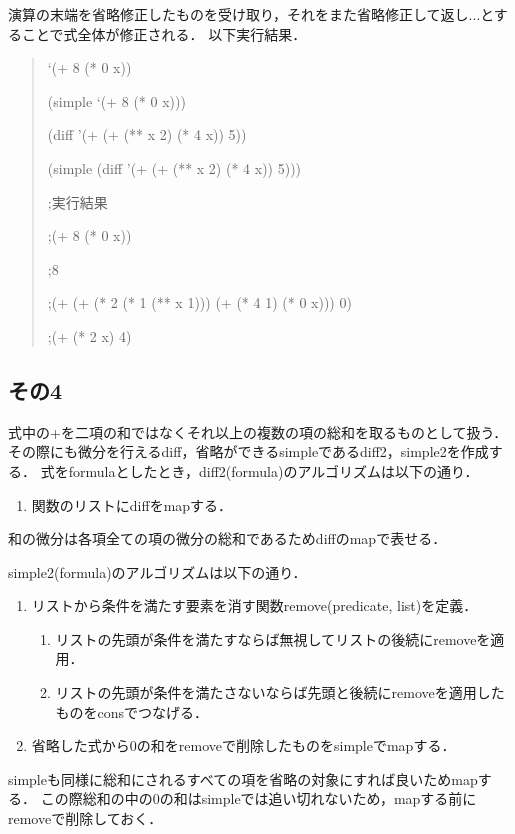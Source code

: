 演算の末端を省略修正したものを受け取り，それをまた省略修正して返し...とすることで式全体が修正される．
以下実行結果．

\begin{quote}
  
  `(+ 8 (* 0 x))
  
  (simple `(+ 8 (* 0 x)))
  
  (diff '(+ (+ (** x 2) (* 4 x)) 5))
  
  (simple (diff '(+ (+ (** x 2) (* 4 x)) 5)))
  
  ;実行結果
  
  ;(+ 8 (* 0 x))
  
  ;8
  
  ;(+ (+ (* 2 (* 1 (** x 1))) (+ (* 4 1) (* 0 x))) 0)
  
  ;(+ (* 2 x) 4)

\end{quote}

\subsection{その4}

式中の+を二項の和ではなくそれ以上の複数の項の総和を取るものとして扱う．
その際にも微分を行えるdiff，省略ができるsimpleであるdiff2，simple2を作成する．
式をformulaとしたとき，diff2(formula)のアルゴリズムは以下の通り．

\begin{enumerate}
\item 関数のリストにdiffをmapする．
\end{enumerate}

和の微分は各項全ての項の微分の総和であるためdiffのmapで表せる．

simple2(formula)のアルゴリズムは以下の通り．
\begin{enumerate}
\item リストから条件を満たす要素を消す関数remove(predicate, list)を定義．
  \begin{enumerate}
  \item リストの先頭が条件を満たすならば無視してリストの後続にremoveを適用．
  \item リストの先頭が条件を満たさないならば先頭と後続にremoveを適用したものをconsでつなげる．
  \end{enumerate}
\item 省略した式から0の和をremoveで削除したものをsimpleでmapする．
\end{enumerate}

simpleも同様に総和にされるすべての項を省略の対象にすれば良いためmapする．
この際総和の中の0の和はsimpleでは追い切れないため，mapする前にremoveで削除しておく．


